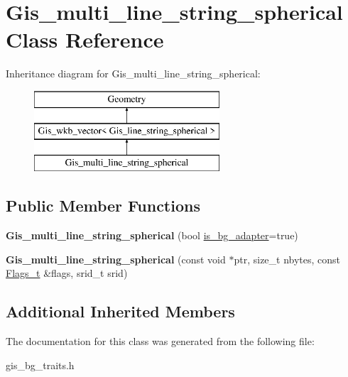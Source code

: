 \hypertarget{classGis__multi__line__string__spherical}{}\section{Gis\+\_\+multi\+\_\+line\+\_\+string\+\_\+spherical Class Reference}
\label{classGis__multi__line__string__spherical}
Inheritance diagram for Gis\+\_\+multi\+\_\+line\+\_\+string\+\_\+spherical\+:\begin{figure}[H]
\begin{center}
\leavevmode
\includegraphics[height=3.000000cm]{classGis__multi__line__string__spherical}
\end{center}
\end{figure}
\subsection*{Public Member Functions}
\begin{DoxyCompactItemize}
\item 
\mbox{\label{classGis__multi__line__string__spherical_a5d982a4171e2e0af4bdb88dd4a4f4f07}} 
{\bfseries Gis\+\_\+multi\+\_\+line\+\_\+string\+\_\+spherical} (bool \mbox{\hyperlink{classGeometry_ada614004627a9e7af129e51a34242af9}{is\+\_\+bg\+\_\+adapter}}=true)
\item 
\mbox{\label{classGis__multi__line__string__spherical_a8e87af449a6942ac36f8fd44c57073f8}} 
{\bfseries Gis\+\_\+multi\+\_\+line\+\_\+string\+\_\+spherical} (const void $\ast$ptr, size\+\_\+t nbytes, const \mbox{\hyperlink{classGeometry_1_1Flags__t}{Flags\+\_\+t}} \&flags, srid\+\_\+t srid)
\end{DoxyCompactItemize}
\subsection*{Additional Inherited Members}


The documentation for this class was generated from the following file\+:\begin{DoxyCompactItemize}
\item 
gis\+\_\+bg\+\_\+traits.\+h\end{DoxyCompactItemize}
